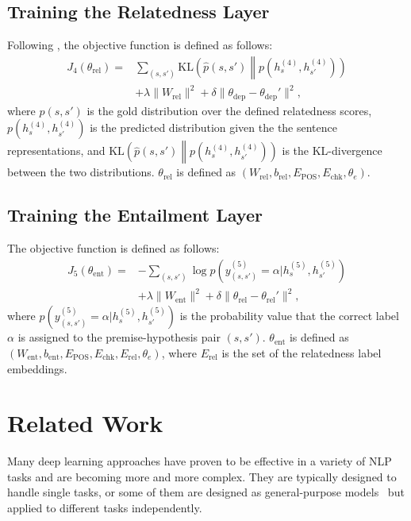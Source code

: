 \documentclass[11pt,a4paper]{article}
\begin{document}
\subsection{Training the Relatedness Layer}
Following \citet{tai2015treelstm}, the objective function is defined as follows:
\begin{equation}
\begin{split}
J_4(\theta_{\mathrm{rel}})=&\sum_{(s, s')}\mathrm{KL}\left(\hat{p}(s, s')\middle\|p(h^{(4)}_{s}, h^{(4)}_{s'})\right)\\
&+\lambda\|W_{\mathrm{rel}}\|^2+\delta\|\theta_{\mathrm{dep}}-\theta_{\mathrm{dep}}'\|^2,
\end{split}
\end{equation}
where $\hat{p}(s, s')$ is the gold distribution over the defined relatedness scores, $p(h^{(4)}_{s}, h^{(4)}_{s'})$ is the predicted distribution given the the sentence representations, and $\mathrm{KL}\left(\hat{p}(s, s')\middle\|p(h^{(4)}_{s}, h^{(4)}_{s'})\right)$ is the KL-divergence between the two distributions.
$\theta_{\mathrm{rel}}$ is defined as $(W_{\mathrm{rel}}, b_{\mathrm{rel}}, E_{\mathrm{POS}}, E_{\mathrm{chk}}, \theta_{e})$.


\subsection{Training the Entailment Layer}
The objective function is defined as follows:
\begin{equation}
\begin{split}
J_5(\theta_{\mathrm{ent}})=&-\sum_{(s, s')}\log{p(y^{(5)}_{(s, s')}=\alpha|h_{s}^{(5)}, h_{s'}^{(5)})}\\
&+\lambda\|W_{\mathrm{ent}}\|^2+\delta\|\theta_{\mathrm{rel}}-\theta_{\mathrm{rel}}'\|^2,
\end{split}
\end{equation}
where $p(y^{(5)}_{(s, s')}=\alpha|h_{s}^{(5)}, h_{s'}^{(5)})$ is the probability value that the correct label $\alpha$ is assigned to the premise-hypothesis pair $(s, s')$.
$\theta_{\mathrm{ent}}$ is defined as $(W_{\mathrm{ent}}, b_{\mathrm{ent}}, E_{\mathrm{POS}}, E_{\mathrm{chk}}, E_{\mathrm{rel}}, \theta_{e})$, where $E_{\mathrm{rel}}$ is the set of the relatedness label embeddings.



\section{Related Work}
Many deep learning approaches have proven to be effective in a variety of NLP tasks and are becoming more and more complex.
They are typically designed to handle single tasks, or some of them are designed as general-purpose models~\citep{kumar2016dmn,sutskever2014seq2seq} but applied to different tasks independently.
\end{document}
